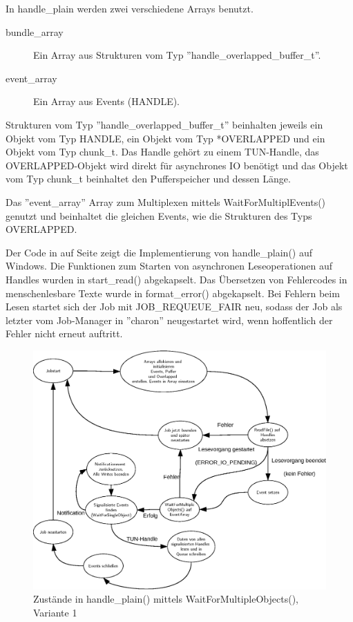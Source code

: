 In handle\_plain werden zwei verschiedene Arrays benutzt.
\begin{description}
\item[bundle\_array] Ein Array aus Strukturen vom Typ ''handle\_overlapped\_buffer\_t''. 
\item[event\_array] Ein Array aus Events (HANDLE).
\end{description}

Strukturen vom Typ ''handle\_overlapped\_buffer\_t'' beinhalten jeweils ein Objekt
vom Typ HANDLE, ein Objekt vom Typ *OVERLAPPED und ein Objekt vom Typ chunk\_t.
Das Handle gehört zu einem TUN-Handle, das OVERLAPPED-Objekt wird direkt für asynchrones
IO benötigt und das Objekt vom Typ chunk\_t beinhaltet den Pufferspeicher und dessen Länge.

Das ''event\_array'' Array zum Multiplexen mittels WaitForMultiplEvents() genutzt und
beinhaltet die gleichen Events, wie die Strukturen des Typs OVERLAPPED.

Der Code in auf Seite \pageref{lst:handle-plain-windows} zeigt die Implementierung von handle\_plain()
auf Windows. Die Funktionen zum Starten von asynchronen Leseoperationen auf Handles
wurden in start\_read() abgekapselt. Das Übersetzen von Fehlercodes in menschenlesbare
Texte wurde in format\_error() abgekapselt. Bei Fehlern beim Lesen startet sich der Job
mit JOB\_REQUEUE\_FAIR neu, sodass der Job als letzter vom Job-Manager in ''charon'' neugestartet wird,
wenn hoffentlich der Fehler nicht erneut auftritt.

\begin{figure}
\centering
\def\svgwidth{\columnwidth}
\includegraphics[width=\textwidth]{WaitForMultipleObjects.eps}
\caption{Zustände in handle\_plain() mittels WaitForMultipleObjects(), Variante 1}
\label{fig:WaitForMultipleObjects}
\end{figure}

